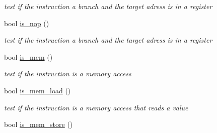 \begin{DoxyCompactItemize}
\begin{DoxyCompactList}\small\item\em test if the instruction a branch and the target adress is in a register \end{DoxyCompactList}\item 
\hypertarget{class_instruction_a2222ad40481088c12a38c5f340bcd86b}{}bool \hyperlink{class_instruction_a2222ad40481088c12a38c5f340bcd86b}{is\+\_\+nop} ()\label{class_instruction_a2222ad40481088c12a38c5f340bcd86b}

\begin{DoxyCompactList}\small\item\em test if the instruction a branch and the target adress is in a register \end{DoxyCompactList}\item 
\hypertarget{class_instruction_a1c79865faf9baa4d70edf81e956d952d}{}bool \hyperlink{class_instruction_a1c79865faf9baa4d70edf81e956d952d}{is\+\_\+mem} ()\label{class_instruction_a1c79865faf9baa4d70edf81e956d952d}

\begin{DoxyCompactList}\small\item\em test if the instruction is a memory access \end{DoxyCompactList}\item 
\hypertarget{class_instruction_aee32f4bb91480afc74375beb139af4d6}{}bool \hyperlink{class_instruction_aee32f4bb91480afc74375beb139af4d6}{is\+\_\+mem\+\_\+load} ()\label{class_instruction_aee32f4bb91480afc74375beb139af4d6}

\begin{DoxyCompactList}\small\item\em test if the instruction is a memory access that reads a value \end{DoxyCompactList}\item 
\hypertarget{class_instruction_a4455144397d239eb61bcfa2b0e16bf67}{}bool \hyperlink{class_instruction_a4455144397d239eb61bcfa2b0e16bf67}{is\+\_\+mem\+\_\+store} ()\label{class_instruction_a4455144397d239eb61bcfa2b0e16bf67}


\end{DoxyCompactItemize}
